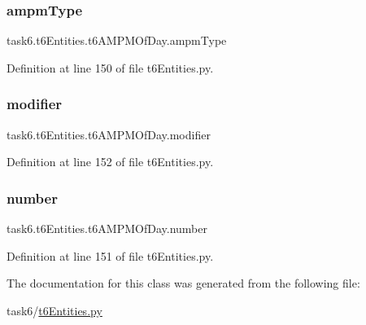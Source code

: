 \subsubsection{\texorpdfstring{ampm\+Type}{ampmType}}
{\footnotesize\ttfamily task6.\+t6\+Entities.\+t6\+A\+M\+P\+M\+Of\+Day.\+ampm\+Type}



Definition at line 150 of file t6\+Entities.\+py.

\mbox{\label{classtask6_1_1t6Entities_1_1t6AMPMOfDay_af7d283b12c4c96aa7e01782436dda882}} 
\subsubsection{\texorpdfstring{modifier}{modifier}}
{\footnotesize\ttfamily task6.\+t6\+Entities.\+t6\+A\+M\+P\+M\+Of\+Day.\+modifier}



Definition at line 152 of file t6\+Entities.\+py.

\mbox{\label{classtask6_1_1t6Entities_1_1t6AMPMOfDay_a99678a4e401421ec921e417fd960f9e8}} 
\subsubsection{\texorpdfstring{number}{number}}
{\footnotesize\ttfamily task6.\+t6\+Entities.\+t6\+A\+M\+P\+M\+Of\+Day.\+number}



Definition at line 151 of file t6\+Entities.\+py.



The documentation for this class was generated from the following file\+:\begin{DoxyCompactItemize}
\item 
task6/\hyperlink{t6Entities_8py}{t6\+Entities.\+py}\end{DoxyCompactItemize}
